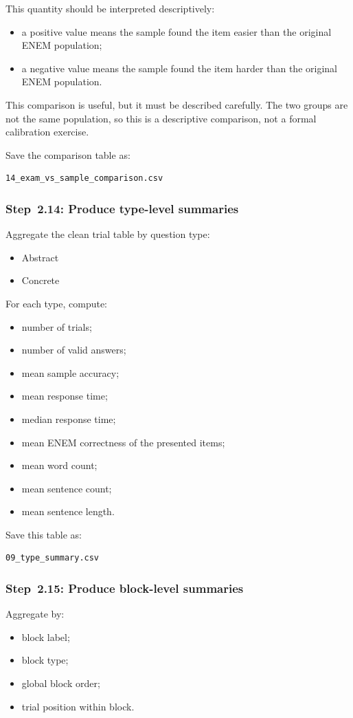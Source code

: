 \documentclass[11pt]{article}
\begin{document}
This quantity should be interpreted descriptively:
\begin{itemize}
    \item a positive value means the sample found the item easier than the original ENEM population;
    \item a negative value means the sample found the item harder than the original ENEM population.
\end{itemize}

This comparison is useful, but it must be described carefully.
The two groups are not the same population, so this is a descriptive comparison, not a formal calibration exercise.

Save the comparison table as:
\begin{verbatim}
14_exam_vs_sample_comparison.csv
\end{verbatim}

\subsubsection{Step~2.14: Produce type-level summaries}
Aggregate the clean trial table by question type:
\begin{itemize}
    \item Abstract
    \item Concrete
\end{itemize}

For each type, compute:
\begin{itemize}
    \item number of trials;
    \item number of valid answers;
    \item mean sample accuracy;
    \item mean response time;
    \item median response time;
    \item mean ENEM correctness of the presented items;
    \item mean word count;
    \item mean sentence count;
    \item mean sentence length.
\end{itemize}

Save this table as:
\begin{verbatim}
09_type_summary.csv
\end{verbatim}

\subsubsection{Step~2.15: Produce block-level summaries}
Aggregate by:
\begin{itemize}
    \item block label;
    \item block type;
    \item global block order;
    \item trial position within block.
\end{itemize}
\end{document}
